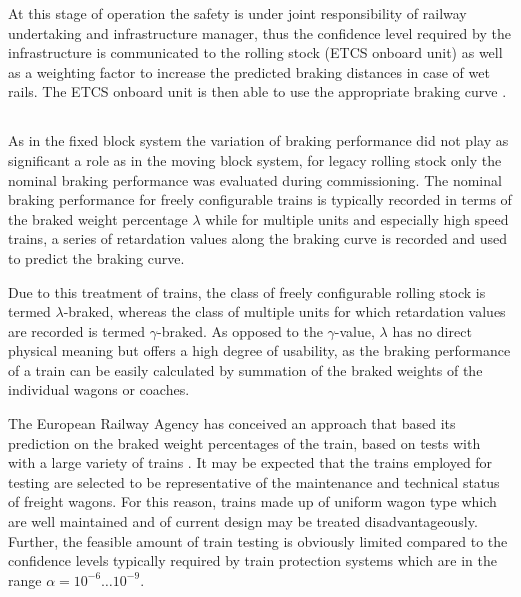 \documentclass[a4paper, 12pt]{scrartcl}
\begin{document}
At this stage of operation the safety is under joint responsibility of railway undertaking and infrastructure manager, thus the confidence level required by the infrastructure is communicated to the rolling stock (ETCS onboard unit) as well as a weighting factor to increase the predicted braking distances in case of wet rails. The ETCS onboard unit is then able to use the appropriate braking curve \cite{ERAbrakingcurves}.

\subsection{}
As in the fixed block system the variation of braking performance did not play as significant a role as in the moving block system, for legacy rolling stock only the nominal braking performance was evaluated during commissioning. The nominal braking performance for freely configurable trains is typically recorded in terms of the braked weight percentage $\lambda$ \cite{uic544-1} while for multiple units and especially high speed trains, a series of retardation values along the braking curve is recorded and used to predict the braking curve.

Due to this treatment of trains, the class of freely configurable rolling stock is termed $\lambda$-braked, whereas the class of multiple units for which retardation values are recorded is termed $\gamma$-braked. As opposed to the $\gamma$-value, $\lambda$ has no direct physical meaning but offers a high degree of usability, as the braking performance of a train can be easily calculated by summation of the braked weights of the individual wagons or coaches.


The European Railway Agency has conceived an approach that based its prediction on the braked weight percentages of the train, based on tests with with a large variety of trains \cite{ERAbrakingcurves}. It may be expected that the trains employed for testing are selected to be representative of the maintenance and technical status of freight wagons. For this reason, trains made up of uniform wagon type which are well maintained and of current design may be treated disadvantageously. Further, the feasible amount of train testing is obviously limited compared to the confidence levels typically required by train protection systems which are in the range $\alpha = 10^{-6} \ldots 10^{-9}$.
\end{document}
